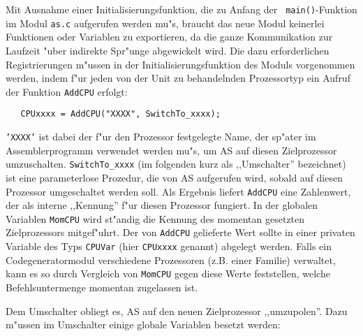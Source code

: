 \documentclass[12pt,a4paper,twoside]{report}
\newcommand{\tty}[1]{{\tt #1}}
\begin{document}
Mit Ausnahme einer Initialisierungsfunktion, die zu Anfang der {\tt
main()}-Funktion im Modul {\tt as.c} aufgerufen werden mu"s, braucht das
neue Modul keinerlei Funktionen oder Variablen zu exportieren, da die
ganze Kommunikation zur Laufzeit "uber indirekte Spr"unge abgewickelt
wird.  Die dazu erforderlichen Registrierungen m"ussen in der
Initialisierungsfunktion des Moduls vorgenommen werden, indem f"ur jeden
von der Unit zu behandelnden Prozessortyp
ein Aufruf der Funktion \tty{AddCPU} erfolgt:
\begin{verbatim}
   CPUxxxx = AddCPU("XXXX", SwitchTo_xxxx);
\end{verbatim}
\tty{'XXXX'} ist dabei der f"ur den Prozessor festgelegte Name, der sp"ater
im Assemblerprogramm verwendet werden mu"s, um AS auf diesen Zielprozessor
umzuschalten.  \tty{SwitchTo\_xxxx} (im folgenden kurz als ,,Umschalter''
bezeichnet) ist eine parameterlose Prozedur, die von AS aufgerufen wird,
sobald auf diesen Prozessor umgeschaltet werden soll.  Als Ergebnis liefert
\tty{AddCPU} eine Zahlenwert, der als interne ,,Kennung'' f"ur diesen Prozessor
fungiert.  In der globalen Variablen \tty{MomCPU} wird st"andig die Kennung
des momentan gesetzten Zielprozessors mitgef"uhrt.  Der von \tty{AddCPU}
gelieferte Wert sollte in einer privaten Variable des Typs \tty{CPUVar} (hier
\tty{CPUxxxx} genannt) abgelegt werden.  Falls ein Codegeneratormodul
verschiedene Prozessoren (z.B. einer Familie) verwaltet, kann es so
durch Vergleich von \tty{MomCPU} gegen diese Werte feststellen, welche
Befehlsuntermenge momentan zugelassen ist.
\par
Dem Umschalter obliegt es, AS auf den neuen Zielprozessor ,,umzupolen''.
Dazu m"ussen im Umschalter einige globale Variablen besetzt werden:
\end{document}
